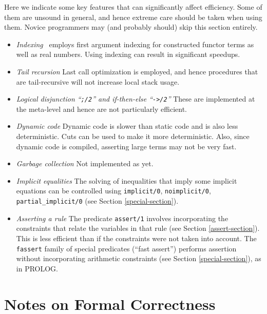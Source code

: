 Here we indicate some key features that can significantly 
affect efficiency.  Some of them are unsound in general, and hence
extreme care should be taken when using them.
Novice programmers may (and probably should) skip this section entirely.

\begin{itemize}
\item {\em Indexing} \nl
	\CLPR\ employs first argument indexing for constructed functor 
	terms as well as real numbers.   Using indexing can result in
	significant speedups.
\item {\em Tail recursion} \nl
	Last call optimization is employed, and hence procedures that
	are tail-recursive will not increase local stack usage.
\item {\em Logical disjunction ``{\tt ;/2}'' and 
	if-then-else ``{\tt ->/2}''}  \nl
	These are implemented at the meta-level and hence are not
    particularly efficient.
\item {\em Dynamic code} \nl
	Dynamic code is slower than static code and is also less
	deterministic. Cuts can be used to make it more deterministic.
	Also, since dynamic code is compiled, asserting large terms
	may not be very fast.
\item {\em Garbage collection} \nl
	Not implemented as yet.
\item {\em Implicit equalities} \nl
	The solving of inequalities that imply some implicit equations can
	be controlled using {\tt implicit/0}, {\tt noimplicit/0},
	{\tt partial\_implicit/0} (see Section \ref{special-section}).
\item {\em Asserting a rule} \nl
	The predicate {\tt assert/1} involves incorporating the constraints
	that relate the variables in that rule (see Section \ref{assert-section}).
	This is less efficient than if the constraints were not taken
	into account. The {\tt fassert} family of special 
    predicates (``fast assert'') performs assertion without
    incorporating arithmetic constraints (see Section \ref{special-section}),
	as in PROLOG.
\end{itemize}

\section{Notes on Formal Correctness}

